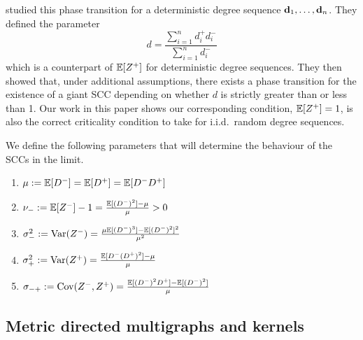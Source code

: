 \citet{cooperSizeLargestStrongly2004} studied this phase transition for a deterministic degree sequence ${\mathbf d}_1, \ldots, {\mathbf d}_n$. They defined the parameter
\begin{equation*}
    d = \frac{\sum_{i=1}^n d_i^+ d_i^-}{\sum_{i=1}^n d_i^-}
\end{equation*}
which is a counterpart of ${\mathbb E}[Z^+]$ for deterministic degree sequences. They then showed that, under additional assumptions, there exists a phase transition for the existence of a giant SCC depending on whether $d$ is strictly greater than or less than 1. Our work in this paper shows our corresponding condition, ${\mathbb E}[Z^+] = 1$, is also the correct criticality condition to take for i.i.d.\ random degree sequences.

We define the following parameters that will determine the behaviour of the SCCs in the limit.
\begin{enumerate}
    \item $\mu:={\mathbb E}[D^-]={\mathbb E}[D^+]={\mathbb E}[D^-D^+]$
    \item $\nu_-:= {\mathbb E}[Z^-] - 1 = \frac{{\mathbb E}[(D^-)^2]-\mu}{\mu}>0$ 
    \item $\sigma_-^2 := \operatorname{Var}(Z^-) = \frac{\mu{\mathbb E}[(D^-)^3]-{\mathbb E}[(D^-)^2]^2}{\mu^2}$ 
    \item $\sigma_+^2 := \operatorname{Var}(Z^+) = \frac{{\mathbb E}[D^-(D^+)^2]-\mu}{\mu}$ 
    \item $\sigma_{-+} := \operatorname{Cov}(Z^-, Z^+) = \frac{{\mathbb E}[(D^-)^2D^+]-{\mathbb E}[(D^-)^2]}{\mu}$ 
\end{enumerate}
\subsection{Metric directed multigraphs and kernels}\label{subsec.mdmkernels}

